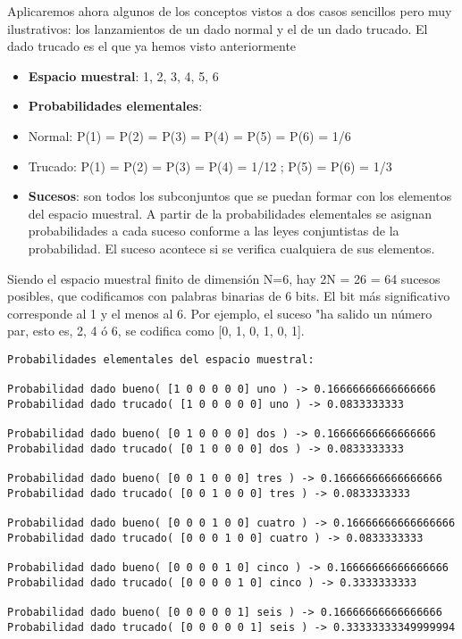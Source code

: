 \documentclass[11pt]{article}
\providecommand{\tightlist}{%
      \setlength{\itemsep}{0pt}\setlength{\parskip}{0pt}}
\begin{document}
Aplicaremos ahora algunos de los conceptos vistos a dos casos sencillos
pero muy ilustrativos: los lanzamientos de un dado normal y el de un
dado trucado. El dado trucado es el que ya hemos visto anteriormente

\begin{itemize}
\tightlist
\item
  \textbf{Espacio muestral}: 1, 2, 3, 4, 5, 6
\item
  \textbf{Probabilidades elementales}:
\item
  Normal: P(1) = P(2) = P(3) = P(4) = P(5) = P(6) = 1/6
\item
  Trucado: P(1) = P(2) = P(3) = P(4) = 1/12 ; P(5) = P(6) = 1/3
\item
  \textbf{Sucesos}: son todos los subconjuntos que se puedan formar con
  los elementos del espacio muestral. A partir de la probabilidades
  elementales se asignan probabilidades a cada suceso conforme a las
  leyes conjuntistas de la probabilidad. El suceso acontece si se
  verifica cualquiera de sus elementos.
\end{itemize}

Siendo el espacio muestral finito de dimensión N=6, hay 2N = 26 = 64
sucesos posibles, que codificamos con palabras binarias de 6 bits. El
bit más significativo corresponde al 1 y el menos al 6. Por ejemplo, el
suceso "ha salido un número par, esto es, 2, 4 ó 6, se codifica como
{[}0, 1, 0, 1, 0, 1{]}.

    \begin{Verbatim}[commandchars=\\\{\}]
Probabilidades elementales del espacio muestral:

Probabilidad dado bueno( [1 0 0 0 0 0] uno ) -> 0.16666666666666666
Probabilidad dado trucado( [1 0 0 0 0 0] uno ) -> 0.0833333333 

Probabilidad dado bueno( [0 1 0 0 0 0] dos ) -> 0.16666666666666666
Probabilidad dado trucado( [0 1 0 0 0 0] dos ) -> 0.0833333333 

Probabilidad dado bueno( [0 0 1 0 0 0] tres ) -> 0.16666666666666666
Probabilidad dado trucado( [0 0 1 0 0 0] tres ) -> 0.0833333333 

Probabilidad dado bueno( [0 0 0 1 0 0] cuatro ) -> 0.16666666666666666
Probabilidad dado trucado( [0 0 0 1 0 0] cuatro ) -> 0.0833333333 

Probabilidad dado bueno( [0 0 0 0 1 0] cinco ) -> 0.16666666666666666
Probabilidad dado trucado( [0 0 0 0 1 0] cinco ) -> 0.3333333333 

Probabilidad dado bueno( [0 0 0 0 0 1] seis ) -> 0.16666666666666666
Probabilidad dado trucado( [0 0 0 0 0 1] seis ) -> 0.33333333349999994 


    \end{Verbatim}
\end{document}
